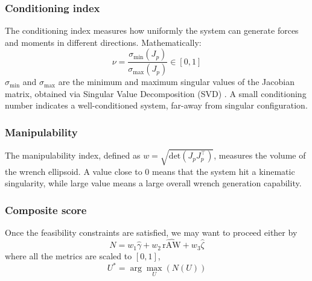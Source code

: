 

\subsubsection{Conditioning index}
The conditioning index measures how uniformly the system can generate forces and moments in different directions. Mathematically:
\begin{equation}
    \nu = \frac{\sigma_{\min}(J_p)}{\sigma_{\max}(J_p)} \in [0, 1]
\end{equation}
$\sigma_{\min}$ and $\sigma_{\max}$ are the minimum and maximum singular values of the Jacobian matrix, obtained via Singular Value Decomposition (SVD) \cite{erskine_dynamic_2021}. A small conditioning number indicates a well-conditioned system, far-away from singular configuration.

\subsubsection{Manipulability}
The manipulability index, defined as $w = \sqrt{\text{det}(J_pJ_p^\top)}$, measures the volume of the wrench ellipsoid. A value close to 0 means that the system hit a kinematic singularity, while large value means a large overall wrench generation capability.

\subsubsection{Composite score}
Once the feasibility constraints are satisfied, we may want to proceed either by
\begin{equation}
    N =w_1 \hat{\gamma} + w_2 \,  \hat{\text{rAW}} + w_3 \hat{\zeta}
\end{equation}
where all the metrics are scaled to $[0, 1]$, 
\begin{equation}
    U^* =\arg \max_U \left(N(U) \right)
\end{equation}



